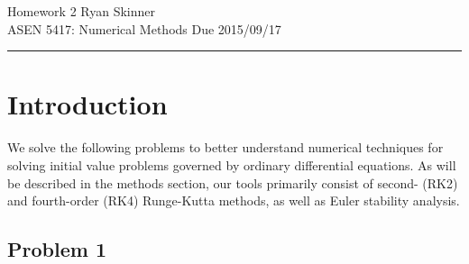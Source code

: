 \documentclass[12pt]{article}
\begin{document}
\pagestyle{fancyplain}
\lhead{}
\chead{}
\rhead{}
\cfoot{\thepage}

\noindent
{\Large Homework 2}
\hfill
{\large Ryan Skinner}
\\[0.5ex]
{\large ASEN 5417: Numerical Methods}
\hfill
{\large Due 2015/09/17}\\
\hrule
\vspace{6pt}

\section{Introduction} %

We solve the following problems to better understand numerical techniques for solving initial value problems governed by ordinary differential equations. As will be described in the methods section, our tools primarily consist of second- (RK2) and fourth-order (RK4) Runge-Kutta methods, as well as Euler stability analysis.

\subsection{Problem 1}
\end{document}
